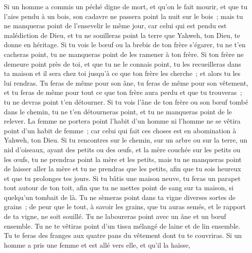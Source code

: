 \begin{multicols}{2}
Si un homme a commis un péché digne de mort, et qu'on le fait mourir, et que tu l'aies pendu à un bois,
son cadavre ne passera point la nuit sur le bois~; mais tu ne manqueras point de l'ensevelir le même jour, car celui qui est pendu est malédiction de Dieu, et tu ne souilleras point la terre que Yahweh, ton Dieu, te donne en héritage.
\VerseOne{}Si tu vois le bœuf ou la brebis de ton frère s'égarer, tu ne t'en cacheras point, tu ne manqueras point de les ramener à ton frère.
Si ton frère ne demeure point près de toi, et que tu ne le connais point, tu les recueilleras dans ta maison et il sera chez toi jusqu'à ce que ton frère les cherche~; et alors tu les lui rendras.
Tu feras de même pour son âne, tu feras de même pour son vêtement, et tu feras de même pour tout ce que ton frère aura perdu et que tu trouveras~; tu ne devras point t'en détourner.
Si tu vois l'âne de ton frère ou son bœuf tombé dans le chemin, tu ne t'en détourneras point, et tu ne manqueras point de le relever.
La femme ne portera point l'habit d'un homme ni l'homme ne se vêtira point d'un habit de femme~; car celui qui fait ces choses est en abomination à Yahweh, ton Dieu.
Si tu rencontres sur le chemin, sur un arbre ou sur la terre, un nid d'oiseaux, ayant des petits ou des œufs, et la mère couchée sur les petits ou les œufs, tu ne prendras point la mère et les petits,
mais tu ne manqueras point de laisser aller la mère et tu ne prendras que les petits, afin que tu sois heureux et que tu prolonges tes jours.
Si tu bâtis une maison neuve, tu feras un parapet tout autour de ton toit, afin que tu ne mettes point de sang sur ta maison, si quelqu'un tombait de là.
Tu ne sèmeras point dans ta vigne diverses sortes de grains~; de peur que le tout, à savoir les grains, que tu auras semés, et le rapport de ta vigne, ne soit souillé. 
Tu ne laboureras point avec un âne et un bœuf ensemble.
Tu ne te vêtiras point d'un tissu mélangé de laine et de lin ensemble.
Tu te feras des franges aux quatre pans du vêtement dont tu te couvriras.
Si un homme a pris une femme et est allé vers elle, et qu'il la haïsse,

\end{multicols}
